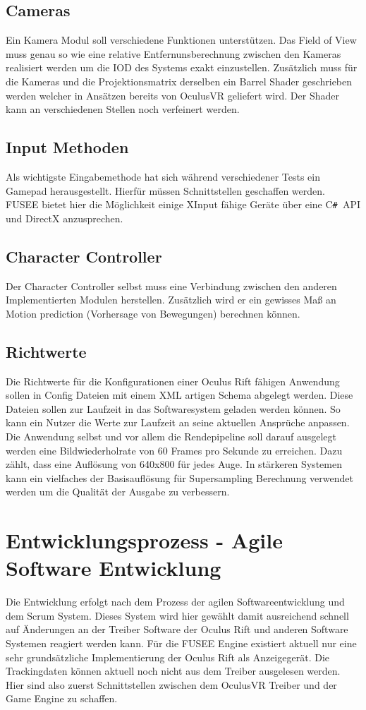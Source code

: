 \documentclass[pagesize, paper=a4, fontsize=12pt,titlepage=true, headings=small, headnosepline, abstractoff, liststotoc, nochapterprefix, plainheadsepline]{scrreprt}
\newcommand{\CSS}{C\texttt{\# }}
\begin{document}
\subsection{Cameras}
Ein Kamera Modul soll verschiedene Funktionen unterstützen. Das Field of View muss genau  so wie eine relative Entfernunsberechnung zwischen den Kameras realisiert werden um die IOD des Systems exakt einzustellen. Zusätzlich muss für die Kameras und die Projektionsmatrix derselben ein Barrel Shader geschrieben werden welcher in Ansätzen bereits von OculusVR geliefert wird. Der Shader kann an verschiedenen Stellen noch verfeinert werden.
\subsection{Input Methoden}
Als wichtigste Eingabemethode hat sich während verschiedener Tests ein Gamepad herausgestellt. Hierfür müssen Schnittstellen geschaffen werden. FUSEE bietet hier die Möglichkeit einige XInput fähige Geräte über eine \CSS API und DirectX anzusprechen. 
\subsection{Character Controller}
Der Character Controller selbst muss eine Verbindung zwischen den anderen Implementierten Modulen herstellen. Zusätzlich wird er ein gewisses Maß an Motion prediction (Vorhersage von Bewegungen) berechnen können.
\subsection{Richtwerte}
Die Richtwerte für die Konfigurationen einer Oculus Rift fähigen Anwendung sollen in Config Dateien mit einem XML artigen Schema abgelegt werden. Diese Dateien sollen zur Laufzeit in das Softwaresystem geladen werden können. So kann ein Nutzer die Werte zur Laufzeit an seine aktuellen Ansprüche anpassen. Die Anwendung selbst und vor allem die Rendepipeline soll darauf ausgelegt werden eine Bildwiederholrate von 60 Frames pro Sekunde zu erreichen. Dazu zählt, dass eine Auflösung von 640x800 für jedes Auge. In stärkeren Systemen kann ein vielfaches der Basisauflösung für Supersampling Berechnung verwendet werden um die Qualität der Ausgabe zu verbessern.

\section{Entwicklungsprozess - Agile Software Entwicklung}
Die Entwicklung erfolgt nach dem Prozess der agilen Softwareentwicklung und dem Scrum System. Dieses System wird hier gewählt damit ausreichend schnell auf Änderungen an der Treiber Software der Oculus Rift und anderen Software Systemen reagiert werden kann. Für die FUSEE Engine existiert aktuell nur eine sehr grundsätzliche Implementierung der Oculus Rift als Anzeigegerät. Die Trackingdaten können aktuell noch nicht aus dem Treiber ausgelesen werden. Hier sind also zuerst Schnittstellen zwischen dem OculusVR Treiber und der Game Engine zu schaffen. 
\end{document}
